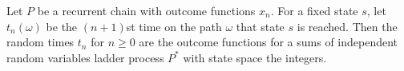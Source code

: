 Let $P$ be a recurrent chain with outcome functions $x_n$. For a fixed state $s$, let $t_n(\omega)$ be the $(n+1)$st time on the path $\omega$ that state $s$ is reached. Then the random times $t_n$ for $n \geq 0$ are the outcome functions for a sums of independent random variables ladder process $P^*$ with state space the integers.
